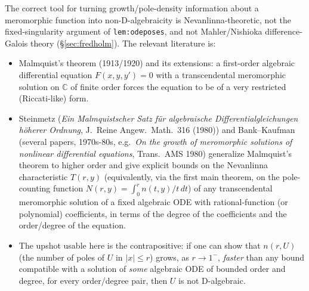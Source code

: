 \documentclass[11pt]{article}
\theoremstyle{remark}
\newcommand{\C}{\mathbb C}
\begin{document}
The correct tool for turning growth/pole-density information about a meromorphic function into
non-D-algebraicity is Nevanlinna-theoretic, not the fixed-singularity argument of
\texttt{lem:odeposes}, and not Mahler/Nishioka difference-Galois theory (\S\ref{sec:fredholm}). The
relevant literature is:
\begin{itemize}
\item Malmquist's theorem (1913/1920) and its extensions: a first-order algebraic differential
equation $F(x,y,y')=0$ with a transcendental meromorphic solution on $\C$ of finite order forces the
equation to be of a very restricted (Riccati-like) form.
\item Steinmetz (\emph{Ein Malmquistscher Satz f\"ur algebraische Differentialgleichungen h\"oherer
Ordnung}, J.\ Reine Angew.\ Math.\ 316 (1980)) and Bank--Kaufman (several papers, 1970s-80s, e.g.\
\emph{On the growth of meromorphic solutions of nonlinear differential equations}, Trans.\ AMS 1980)
generalize Malmquist's theorem to higher order and give explicit bounds on the Nevanlinna
characteristic $T(r,y)$ (equivalently, via the first main theorem, on the pole-counting function
$N(r,y)=\int_0^rn(t,y)/t\,dt$) of any transcendental meromorphic solution of a fixed algebraic ODE
with rational-function (or polynomial) coefficients, in terms of the degree of the coefficients and
the order/degree of the equation.
\item The upshot usable here is the contrapositive: if one can show that $n(r,U)$ (the number of
poles of $U$ in $|x|\le r$) grows, as $r\to1^-$, \emph{faster} than any bound compatible with a
solution of \emph{some} algebraic ODE of bounded order and degree, for every order/degree pair, then
$U$ is not D-algebraic.
\end{itemize}
\end{document}
